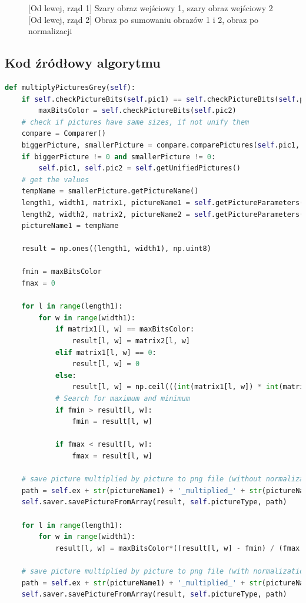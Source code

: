 \documentclass[a4paper,12pt, titlepage]{report}
\begin{document}
\begin{figure}[h]
    \caption{[Od lewej, rząd 1] Szary obraz wejściowy 1, szary obraz wejściowy 2 [Od lewej, rząd 2] Obraz po sumowaniu obrazów 1 i 2, obraz po normalizacji}%
    \label{fig:geo_after_grey1}%
\end{figure}
\FloatBarrier
\subsection*{Kod źródłowy algorytmu}
\begin{lstlisting}[language=Python]
def multiplyPicturesGrey(self):
    if self.checkPictureBits(self.pic1) == self.checkPictureBits(self.pic2):
        maxBitsColor = self.checkPictureBits(self.pic2)
    # check if pictures have same sizes, if not unify them
    compare = Comparer()
    biggerPicture, smallerPicture = compare.comparePictures(self.pic1, self.pic2)
    if biggerPicture != 0 and smallerPicture != 0:
        self.pic1, self.pic2 = self.getUnifiedPictures()
    # get the values
    tempName = smallerPicture.getPictureName()
    length1, width1, matrix1, pictureName1 = self.getPictureParameters(self.pic1)
    length2, width2, matrix2, pictureName2 = self.getPictureParameters(self.pic2)
    pictureName1 = tempName

    result = np.ones((length1, width1), np.uint8)

    fmin = maxBitsColor
    fmax = 0

    for l in range(length1):
        for w in range(width1):
            if matrix1[l, w] == maxBitsColor:
                result[l, w] = matrix2[l, w]
            elif matrix1[l, w] == 0:
                result[l, w] = 0
            else:
                result[l, w] = np.ceil(((int(matrix1[l, w]) * int(matrix2[l, w])) / maxBitsColor))
            # Search for maximum and minimum
            if fmin > result[l, w]:
                fmin = result[l, w]

            if fmax < result[l, w]:
                fmax = result[l, w]

    # save picture multiplied by picture to png file (without normalization)
    path = self.ex + str(pictureName1) + '_multiplied_' + str(pictureName2) + '.png'
    self.saver.savePictureFromArray(result, self.pictureType, path)

    for l in range(length1):
        for w in range(width1):
            result[l, w] = maxBitsColor*((result[l, w] - fmin) / (fmax - fmin))

    # save picture multiplied by picture to png file (with normalization)
    path = self.ex + str(pictureName1) + '_multiplied_' + str(pictureName2) + '_normalized.png'
    self.saver.savePictureFromArray(result, self.pictureType, path)
\end{lstlisting}
\end{document}
